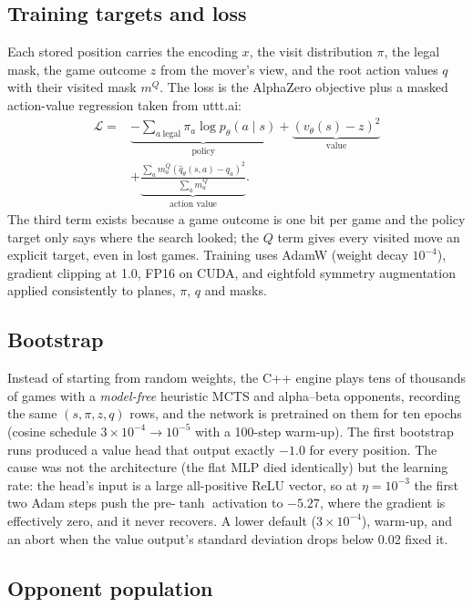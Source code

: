 \documentclass[conference]{IEEEtran}
\newcommand{\utttai}{uttt.ai}
\begin{document}
\subsection{Training targets and loss}

Each stored position carries the encoding $x$, the visit distribution
$\pi$, the legal mask, the game outcome $z$ from the mover's view, and the
root action values $q$ with their visited mask $m^Q$. The loss is the
AlphaZero objective plus a masked action-value regression taken from
\utttai:
\begin{equation}
\begin{split}
  \mathcal L={}&\underbrace{-\!\!\sum_{a\ \mathrm{legal}}\!\pi_a\log p_\theta(a\mid s)}_{\text{policy}}
  +\underbrace{(v_\theta(s)-z)^2}_{\text{value}}\\
  &+\underbrace{\frac{\sum_a m^Q_a(\hat q_\theta(s,a)-q_a)^2}{\sum_a m^Q_a}}_{\text{action value}} .
\end{split}
\end{equation}
The third term exists because a game outcome is one bit per game and the
policy target only says where the search looked; the $Q$ term gives every
visited move an explicit target, even in lost games. Training uses AdamW
\cite{loshchilov2019adamw} (weight decay $10^{-4}$), gradient clipping at
1.0, FP16 on CUDA, and eightfold symmetry augmentation applied
consistently to planes, $\pi$, $q$ and masks.

\subsection{Bootstrap}

Instead of starting from random weights, the C++ engine plays tens of
thousands of games with a \emph{model-free} heuristic MCTS and alpha--beta
opponents, recording the same $(s,\pi,z,q)$ rows, and the network is
pretrained on them for ten epochs (cosine schedule $3\times10^{-4}\to
10^{-5}$ with a 100-step warm-up). The first bootstrap runs produced a
value head that output exactly $-1.0$ for every position. The cause was
not the architecture (the flat MLP died identically) but the learning rate:
the head's input is a large all-positive ReLU vector, so at $\eta=10^{-3}$
the first two Adam steps push the pre-$\tanh$ activation to $-5.27$, where
the gradient is effectively zero, and it never recovers. A lower default
($3\times10^{-4}$), warm-up, and an abort when the value output's standard
deviation drops below 0.02 fixed it.

\subsection{Opponent population}
\end{document}
